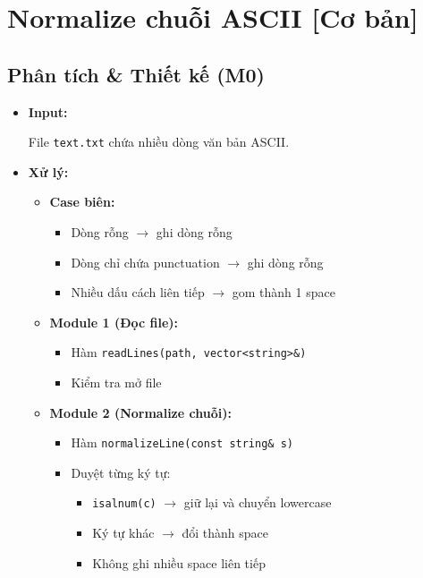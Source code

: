 \section{Normalize chuỗi ASCII [Cơ bản]}
\subsection{Phân tích \& Thiết kế (M0)}

\begin{itemize}

    \item \textbf{Input:}

    File \texttt{text.txt} chứa nhiều dòng văn bản ASCII.

    \item \textbf{Xử lý:}

    \begin{itemize}

        \item \textbf{Case biên:}

        \begin{itemize}
            \item Dòng rỗng $\rightarrow$ ghi dòng rỗng
            \item Dòng chỉ chứa punctuation $\rightarrow$ ghi dòng rỗng
            \item Nhiều dấu cách liên tiếp $\rightarrow$ gom thành 1 space
        \end{itemize}

        \item \textbf{Module 1 (Đọc file):}

        \begin{itemize}
            \item Hàm \texttt{readLines(path, vector<string>\&)}
            \item Kiểm tra mở file
        \end{itemize}

        \item \textbf{Module 2 (Normalize chuỗi):}

        \begin{itemize}
            \item Hàm \texttt{normalizeLine(const string\& s)}
            \item Duyệt từng ký tự:
            \begin{itemize}
                \item \texttt{isalnum(c)} $\rightarrow$ giữ lại và chuyển lowercase
                \item Ký tự khác $\rightarrow$ đổi thành space
                \item Không ghi nhiều space liên tiếp
            \end{itemize}
        \end{itemize}


\end{itemize}
\end{itemize}
